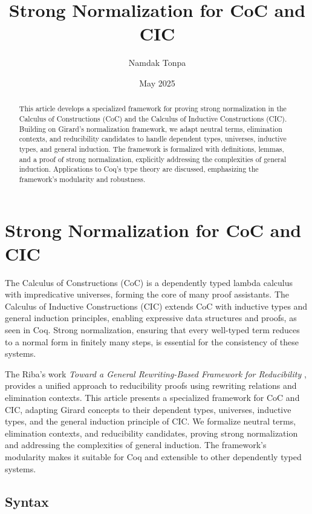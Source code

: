 \documentclass{article}
\theoremstyle{plain}
\theoremstyle{definition}
\begin{document}
\title{Strong Normalization for CoC and CIC}
\author{Namdak Tonpa}
\date{May 2025}
\maketitle

\begin{abstract}
This article develops a specialized framework for proving strong normalization
in the Calculus of Constructions (CoC) and the Calculus of Inductive Constructions (CIC).
Building on Girard’s normalization framework, we adapt neutral terms,
elimination contexts, and reducibility candidates to handle dependent types,
universes, inductive types, and general induction. The framework is formalized
with definitions, lemmas, and a proof of strong normalization, explicitly
addressing the complexities of general induction. Applications to Coq’s type
theory are discussed, emphasizing the framework’s modularity and robustness.
\end{abstract}

\section{Strong Normalization for CoC and CIC}

The Calculus of Constructions (CoC) \cite{coquand1988} is a dependently typed
lambda calculus with impredicative universes, forming the core of many proof assistants.
The Calculus of Inductive Constructions (CIC) \cite{coquand1990} extends CoC with inductive
types and general induction principles, enabling expressive data structures and proofs,
as seen in Coq. Strong normalization, ensuring that every well-typed term reduces to
a normal form in finitely many steps, is essential for the consistency of these systems.

The Riba’s work \emph{Toward a General Rewriting-Based Framework for Reducibility} \cite{riba2008},
provides a unified approach to reducibility proofs using rewriting relations and elimination contexts.
This article presents a specialized framework for CoC and CIC, adapting Girard concepts
to their dependent types, universes, inductive types, and the general induction principle of CIC.
We formalize neutral terms, elimination contexts, and reducibility candidates,
proving strong normalization and addressing the complexities of general induction.
The framework’s modularity makes it suitable for Coq and extensible to other dependently typed systems.

\newpage
\subsection*{Syntax}
\end{document}
